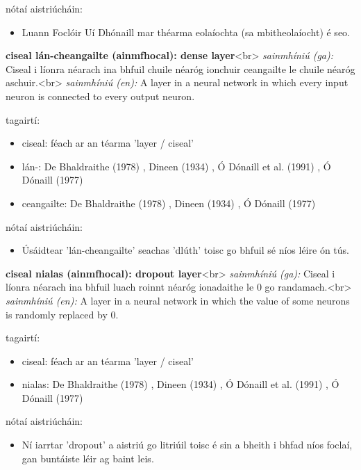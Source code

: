 \documentclass{article}
\begin{document}
nótaí aistriúcháin:
\begin{itemize}
	\item Luann Foclóir Uí Dhónaill mar théarma eolaíochta (sa mbitheolaíocht) é seo.
\end{itemize}


\textbf{ciseal lán-cheangailte (ainmfhocal): dense layer}<br>
\textit{sainmhíniú (ga):} Ciseal i líonra néarach ina bhfuil chuile néaróg ionchuir ceangailte le chuile néaróg aschuir.<br>
\textit{sainmhíniú (en):} A layer in a neural network in which every input neuron is connected to every output neuron.

tagairtí:
\begin{itemize}
	\item ciseal: féach ar an téarma 'layer / ciseal'
	\item lán-: De Bhaldraithe (1978) \cite{de-bhaldraithe}, Dineen (1934) \cite{dineen}, Ó Dónaill et al. (1991) \cite{focloir-beag}, Ó Dónaill (1977) \cite{odonaill}
	\item ceangailte: De Bhaldraithe (1978) \cite{de-bhaldraithe}, Dineen (1934) \cite{dineen}, Ó Dónaill (1977) \cite{odonaill}
\end{itemize}

nótaí aistriúcháin:
\begin{itemize}
	\item Úsáidtear 'lán-cheangailte' seachas 'dlúth' toisc go bhfuil sé níos léire ón tús.
\end{itemize}


\textbf{ciseal nialas (ainmfhocal): dropout layer}<br>
\textit{sainmhíniú (ga):} Ciseal i líonra néarach ina bhfuil luach roinnt néaróg ionadaithe le 0 go randamach.<br>
\textit{sainmhíniú (en):} A layer in a neural network in which the value of some neurons is randomly replaced by 0.

tagairtí:
\begin{itemize}
	\item ciseal: féach ar an téarma 'layer / ciseal'
	\item nialas: De Bhaldraithe (1978) \cite{de-bhaldraithe}, Dineen (1934) \cite{dineen}, Ó Dónaill et al. (1991) \cite{focloir-beag}, Ó Dónaill (1977) \cite{odonaill}
\end{itemize}

nótaí aistriúcháin:
\begin{itemize}
	\item Ní iarrtar 'dropout' a aistriú go litriúil toisc é sin a bheith i bhfad níos foclaí, gan buntáiste léir ag baint leis.
\end{itemize}
\end{document}
